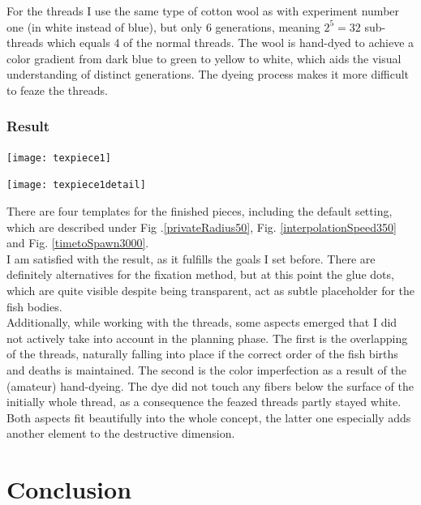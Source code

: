 \documentclass{scrartcl}
\begin{document}
For the threads I use the same type of cotton wool as with experiment number one (in white instead of blue), but only 6 generations, meaning $2^5 = 32$ sub-threads which equals 4 of the normal threads. The wool is hand-dyed to achieve a color gradient from dark blue to green to yellow to white, which aids the visual understanding of distinct generations. The dyeing process makes it more difficult to feaze the threads.

\subsubsection{Result}

\begin{minipage}[t]{0.46\textwidth}
\texttt{[image: texpiece1]}
\end{minipage}
\hspace{0.5cm}
\begin{minipage}[t]{0.46\textwidth}
\texttt{[image: texpiece1detail]}
\end{minipage}
\vspace{0.5cm}

There are four templates for the finished pieces, including the default setting, which are described under Fig .\ref{privateRadius50}, Fig. \ref{interpolationSpeed350} and Fig. \ref{timetoSpawn3000}.\\
I am satisfied with the result, as it fulfills the goals I set before.
There are definitely alternatives for the fixation method, but at this point the glue dots, which are quite visible despite being transparent, act as subtle placeholder for the fish bodies.\\
Additionally, while working with the threads, some aspects emerged that I did not actively take into account in the planning phase. 
The first is the overlapping of the threads, naturally falling into place if the correct order of the fish births and deaths is maintained.
The second is the color imperfection as a result of the (amateur) hand-dyeing. The dye did not touch any fibers below the surface of the initially whole thread, as a consequence the feazed threads partly stayed white.
Both aspects fit beautifully into the whole concept, the latter one especially adds another element to the destructive dimension.

\section{Conclusion}
\end{document}
